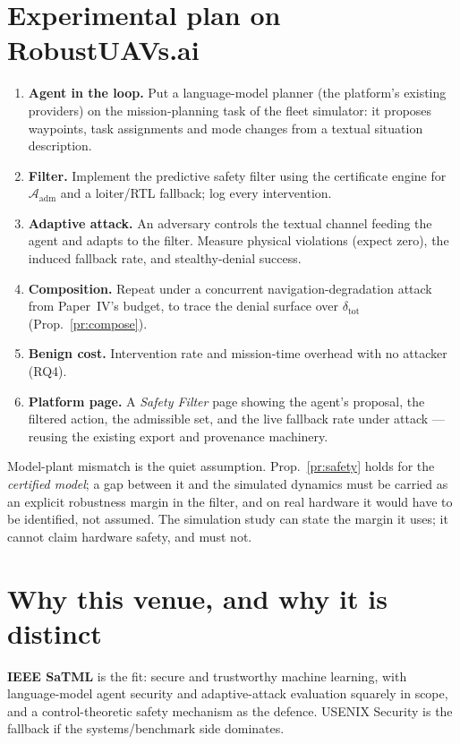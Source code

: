 \documentclass[11pt,a4paper]{article}
\newcommand{\adm}{\mathcal A_{\mathrm{adm}}}
\begin{document}
\section{Experimental plan on RobustUAVs.ai}
\begin{enumerate}
\item \textbf{Agent in the loop.} Put a language-model planner (the platform's
  existing providers) on the mission-planning task of the fleet simulator:
  it proposes waypoints, task assignments and mode changes from a textual
  situation description.
\item \textbf{Filter.} Implement the predictive safety filter using the
  certificate engine for $\adm$ and a loiter/RTL fallback; log every
  intervention.
\item \textbf{Adaptive attack.} An adversary controls the textual channel feeding
  the agent and adapts to the filter. Measure physical violations (expect zero),
  the induced fallback rate, and stealthy-denial success.
\item \textbf{Composition.} Repeat under a concurrent navigation-degradation
  attack from Paper~IV's budget, to trace the denial surface over
  $\delta_{\mathrm{tot}}$ (Prop.~\ref{pr:compose}).
\item \textbf{Benign cost.} Intervention rate and mission-time overhead with no
  attacker (RQ4).
\item \textbf{Platform page.} A \emph{Safety Filter} page showing the agent's
  proposal, the filtered action, the admissible set, and the live fallback rate
  under attack --- reusing the existing export and provenance machinery.
\end{enumerate}

\begin{honestly}
Model-plant mismatch is the quiet assumption. Prop.~\ref{pr:safety} holds for
the \emph{certified model}; a gap between it and the simulated dynamics must be
carried as an explicit robustness margin in the filter, and on real hardware it
would have to be identified, not assumed. The simulation study can state the
margin it uses; it cannot claim hardware safety, and must not.
\end{honestly}

\section{Why this venue, and why it is distinct}
\textbf{IEEE SaTML} is the fit: secure and trustworthy machine learning, with
language-model agent security and adaptive-attack evaluation squarely in scope,
and a control-theoretic safety mechanism as the defence. USENIX Security is the
fallback if the systems/benchmark side dominates.
\end{document}
